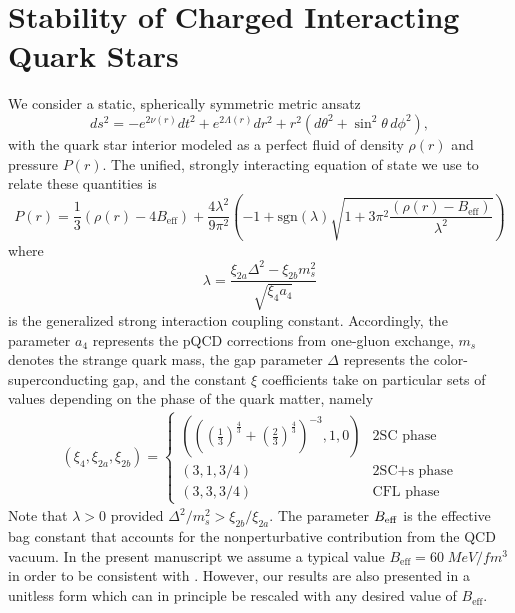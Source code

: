 \documentclass[12pt,noshowpacs,nofootinbib,notitlepage,amsmath,superscriptaddress]{revtex4-1}%
\begin{document}
\section{Stability of Charged Interacting Quark Stars}\label{sec:stability}

We consider a static, spherically symmetric metric ansatz
\begin{equation}
     ds^2 = -e^{2\nu(r)} dt^2 + e^{2\Lambda(r)} dr^2
  + r^2\left(d\theta^2 + \sin^2\theta\, d\phi^2\right),
  \label{metric}
\end{equation}
with the quark star interior modeled as a perfect fluid of density $\rho(r)$ and pressure $P(r)$. 
The unified, strongly interacting equation of state we use to relate these quantities is~\cite{Zhang:2020jmb}
\begin{equation}
P(r)=\frac{1}{3}(\rho(r)-4B_{\mathrm{eff}})+ \frac{4\lambda^2}{9\pi^2}\left(-1+\mathrm{sgn}(\lambda)\sqrt{1+3\pi^2 \frac{(\rho(r)-B_{\mathrm{eff}})}{\lambda^2}}\right)
\label{eos_tot}
\end{equation}
where 
\begin{equation}
\lambda=\frac{\xi_{2a} \Delta^2-\xi_{2b} m_s^2}{\sqrt{\xi_4 a_4}}
\label{lam}
\end{equation}
is the generalized strong interaction coupling constant.
Accordingly, the parameter $a_4$ represents the pQCD corrections from one-gluon exchange, $m_s$ denotes the strange quark mass, the
gap parameter $\Delta$ represents the color-superconducting gap,  and the constant $\xi$ coefficients take on particular sets of values depending on the phase of the quark matter, namely
\begin{align}
(\xi_4,\xi_{2a}, \xi_{2b}) = \left\{ \begin{array} {ll}
(( \left(\frac{1}{3}\right)^{\frac{4}{3}}+ \left(\frac{2}{3}\right)^{\frac{4}{3}})^{-3},1,0) & \textrm{2SC phase}\\
(3,1,3/4) & \textrm{2SC+s phase}\\
(3,3,3/4)&   \textrm{CFL phase}
\end{array}
\right.
\end{align}
Note that   $\lambda > 0$ provided $\Delta^2/m_s^2>\xi_{2b}/\xi_{2a}$. The parameter $B_{\rm eff}$ is the effective bag constant that accounts for the nonperturbative contribution from the QCD vacuum.  In the present manuscript we assume a typical value  $B_\mathrm{eff}=60 \; \si{MeV/fm^3}$ in order to be consistent with \cite{zhang:2021}. However, our results are also presented in a unitless form which can in principle be rescaled with any desired value of $B_\mathrm{eff}$.
\end{document}
